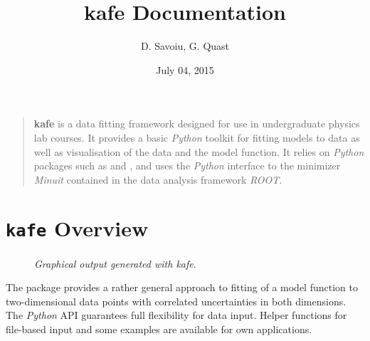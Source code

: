 \documentclass[a4paper,10pt,english]{sphinxmanual}
\title{kafe Documentation}
\date{July 04, 2015}
\author{D. Savoiu, G. Quast}
\begin{document}
\maketitle
\tableofcontents
{}\label{index::doc}

\begin{quote}

\textbf{kafe} is a data fitting framework designed for use in undergraduate
physics lab courses. It provides a basic \emph{Python} toolkit for fitting
models to data as well as visualisation of the data and the model function.
It relies on \emph{Python} packages such as  and ,
and uses the \emph{Python} interface to the minimizer \emph{Minuit} contained in the data
analysis framework \emph{ROOT}.
\end{quote}


\chapter{\texttt{kafe} Overview}
\label{index:welcome-to-kafe-karlsruhe-fit-environment}\label{index:kafe-overview}\begin{figure}[htbp]\begin{flushright}
\capstart

\caption{\emph{Graphical output generated with kafe}.}\end{flushright}\end{figure}

The  package provides a rather general approach to fitting of
a model function to two-dimensional data points with correlated uncertainties
in both dimensions. The \emph{Python} API guarantees full flexibility
for data input. Helper functions for file-based input and some
examples are available for own applications.
\end{document}
